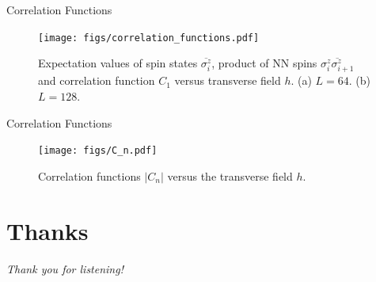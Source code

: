 \documentclass[aspectratio=43]{beamer}
\begin{document}
\begin{frame}{Correlation Functions}
  \begin{figure}[htpb]
    \centering
    \texttt{[image: figs/correlation\_functions.pdf]}
    \caption{Expectation values of spin states $\overline{\sigma_i^z}$, product of NN spins $\overline{\sigma_i^z \sigma_{i+1}^z}$ and correlation function $C_1$ versus transverse field $h$. (a) $L = 64$. (b) $L = 128$.}
    \label{fig:correlation_functions}
  \end{figure}
\end{frame}

\begin{frame}{Correlation Functions}
  \begin{figure}[htpb]
    \centering
    \texttt{[image: figs/C\_n.pdf]}
    \caption{Correlation functions $|C_n|$ versus the transverse field $h$.}
    \label{fig:C_n}
  \end{figure}
\end{frame}

\section*{Thanks}
\begin{frame}{}
  \Huge\centering
  \textit{Thank you for listening!}
\end{frame}
\end{document}
